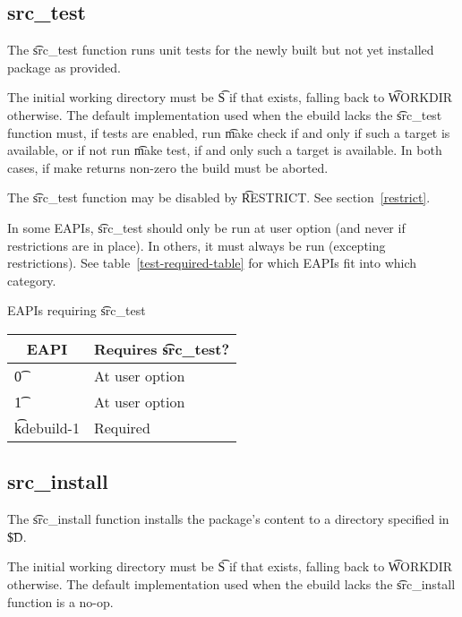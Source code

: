 \subsection{src\_test}
\label{src-test-function}

The \t{src\_test} function runs unit tests for the newly built but not yet installed package as
provided.

The initial working directory must be \t{S} if that exists, falling back to \t{WORKDIR} otherwise.
The default implementation used when the ebuild lacks the \t{src\_test} function must, if tests are
enabled, run \t{make check} if and only if such a target is available, or if not run \t{make test},
if and only such a target is available. In both cases, if make returns non-zero the build must be
aborted.

The \t{src\_test} function may be disabled by \t{RESTRICT}. See section~\ref{restrict}.

\IFKDEBUILDELSE
{
    In some EAPIs, \t{src\_test} should only be run at user option (and never if restrictions are in
    place). In others, it must always be run (excepting restrictions). See table~\ref{test-required-table}
    for which EAPIs fit into which category.

    \begin{centertable}{EAPIs requiring \t{src\_test}} \label{test-required-table}
    \begin{tabular}{ l l }
        \toprule
        \multicolumn{1}{c}{\textbf{EAPI}} &
        \multicolumn{1}{c}{\textbf{Requires \t{src\_test}?}} \\
        \midrule
    \t{0} & At user option \\
    \t{1} & At user option \\
    \t{kdebuild-1} & Required \\
    \bottomrule
    \end{tabular}

    \end{centertable}
}{
}

\subsection{src\_install}
\label{src-install-function}

The \t{src\_install} function installs the package's content to a directory specified in
\t{\${D}}.

The initial working directory must be \t{S} if that exists, falling back to \t{WORKDIR} otherwise.
The default implementation used when the ebuild lacks the \t{src\_install} function is a no-op.

